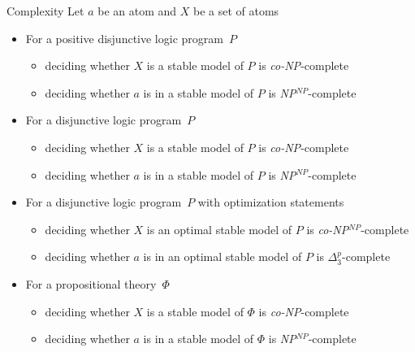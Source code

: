 \begin{frame}{Complexity}
Let $a$ be an atom and $X$ be a set of atoms
\smallskip
\begin{itemize}
\item<1-> For a positive disjunctive logic program~$P$
  \begin{itemize}
  \item deciding whether $X$ is a stable model of $P$ is \textit{co-NP}-complete
  \item deciding whether $a$ is in a stable model of $P$ is \textit{NP}$^{\mathit{NP}}$-complete
  \end{itemize}
  \smallskip
\item<1-> For a disjunctive logic program~$P$
  \begin{itemize}
  \item deciding whether $X$ is a stable model of $P$ is \textit{co-NP}-complete
  \item deciding whether $a$ is in a stable model of $P$ is \textit{NP}$^{\mathit{NP}}$-complete
  \end{itemize}
  \smallskip
\item<1-> For a disjunctive logic program~$P$ with optimization statements
  \begin{itemize}
  \item deciding whether $X$ is an optimal stable model of $P$ is \textit{co-NP}$^{\mathit{NP}}$-complete
  \item deciding whether $a$ is in an optimal stable model of $P$ is $\Delta^p_3$-complete
  \end{itemize}
  \smallskip
\item<2-> For a propositional theory~$\Phi$
  \begin{itemize}
  \item deciding whether $X$ is a stable model of $\Phi$ is \textit{co-NP}-complete
  \item deciding whether $a$ is in a stable model of $\Phi$ is \textit{NP}$^{\mathit{NP}}$-complete
  \end{itemize}
\end{itemize}
\end{frame}
%
